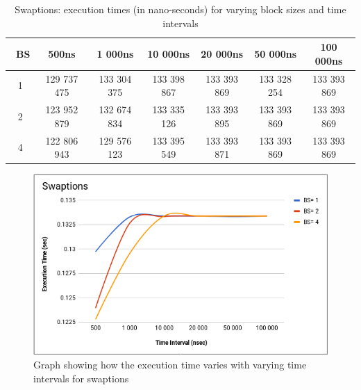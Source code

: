 \documentclass{listhesis}
\begin{document}
\begin{table}[h!]
\begin{center}
 \begin{tabular}{|| c | c | c| c | c | c | c||} 
 \hline
 \ \textbf{BS}  & \textbf{500ns}  & \textbf{1 000ns} & \textbf{10 000ns} & \textbf{20 000ns} & \textbf{50 000ns} & \textbf{100 000ns}\\ [0.5 ex] 
 \hline\hline
   1 & 129 737 475 &  133 304 375 & 133 398 867 & 133 393 869 & 133 328 254 &  133 393 869 \\ 
 \hline
   2 & 123 952 879 & 132 674 834 & 133 335 126 & 133 393 895 & 133 393 869 & 133 393 869 \\
 \hline
   4 & 122 806 943 & 129 576 123 & 133 395 549 & 133 393 871 & 133 393 869 & 133 393 869 \\
 \hline
\end{tabular}
 \caption{Swaptions: execution times (in nano-seconds) for varying block sizes and time intervals}
 \label{table:ExecTimes3}
\end{center}
\end{table}

\begin{figure}
  \includegraphics[width=\linewidth]{Swapt_var_bs_t.png}
  \centering
  \caption{Graph showing how the execution time varies with varying time intervals for swaptions}
  \label{fig:Swapt_var_bs_t.png}
\end{figure}
\end{document}
